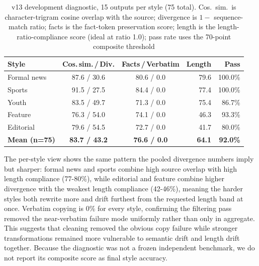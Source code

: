 \documentclass[a4paper,conference]{IEEEtran}
\begin{document}
\begin{table}[!t]
\caption{v13 development diagnostic, 15 outputs per style (75 total). Cos.\ sim.\ is character-trigram cosine overlap with the source; divergence is $1-$ sequence-match ratio; facts is the fact-token preservation score; length is the length-ratio-compliance score (ideal at ratio 1.0); pass rate uses the 70-point composite threshold}
\label{tab:style}
\centering
\footnotesize
\setlength{\tabcolsep}{2.2pt}
\renewcommand{\arraystretch}{1.04}
\begin{tabular}{|l|c|c|r|r|}
\hline
\textbf{Style} & \textbf{Cos.\,sim.\,/\,Div.} & \textbf{Facts\,/\,Verbatim} & \textbf{Length} & \textbf{Pass} \\
\hline
Formal news & 87.6 / 30.6 & 80.6 / 0.0 & 79.6 & 100.0\% \\
\hline
Sports      & 91.5 / 27.5 & 84.4 / 0.0 & 77.4 & 100.0\% \\
\hline
Youth       & 83.5 / 49.7 & 71.3 / 0.0 & 75.4 & 86.7\% \\
\hline
Feature     & 76.3 / 54.0 & 74.1 / 0.0 & 46.3 & 93.3\% \\
\hline
Editorial   & 79.6 / 54.5 & 72.7 / 0.0 & 41.7 & 80.0\% \\
\hline
\textbf{Mean (n=75)} & \textbf{83.7 / 43.2} & \textbf{76.6 / 0.0} & \textbf{64.1} & \textbf{92.0\%} \\
\hline
\end{tabular}
\end{table}

The per-style view shows the same pattern the pooled divergence numbers imply
but sharper: formal news and sports combine high source overlap with high
length compliance (77-80\%), while editorial and feature combine higher
divergence with the weakest length compliance (42-46\%), meaning the harder
styles both rewrite more and drift furthest from the requested length band at
once. Verbatim copying is 0\% for every style, confirming the filtering pass
removed the near-verbatim failure mode uniformly rather than only in
aggregate. This suggests that cleaning removed the obvious copy failure while
stronger transformations remained more vulnerable to semantic drift and length
drift together. Because the diagnostic was not a frozen independent
benchmark, we do not report its composite score as final style accuracy.
\end{document}
